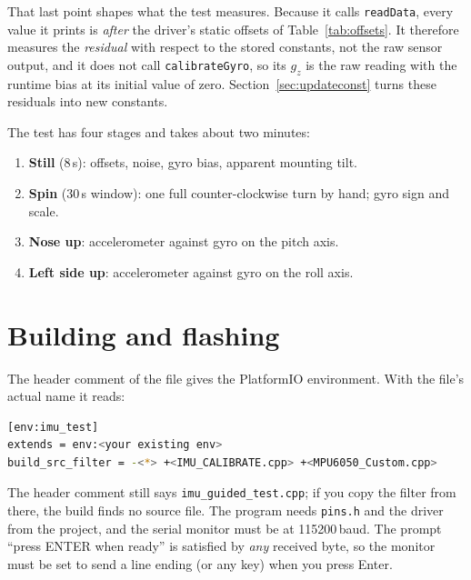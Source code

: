 \documentclass[11pt,a4paper]{report}
\newcommand{\code}[1]{\texttt{#1}}
\begin{document}
That last point shapes what the test measures. Because it calls \code{readData}, every value it prints is \emph{after} the driver's static offsets of Table~\ref{tab:offsets}. It therefore measures the \emph{residual} with respect to the stored constants, not the raw sensor output, and it does not call \code{calibrateGyro}, so its $g_z$ is the raw reading with the runtime bias at its initial value of zero. Section~\ref{sec:updateconst} turns these residuals into new constants.

The test has four stages and takes about two minutes:
\begin{enumerate}[noitemsep]
  \item \textbf{Still} (8\,s): offsets, noise, gyro bias, apparent mounting tilt.
  \item \textbf{Spin} (30\,s window): one full counter-clockwise turn by hand; gyro sign and scale.
  \item \textbf{Nose up}: accelerometer against gyro on the pitch axis.
  \item \textbf{Left side up}: accelerometer against gyro on the roll axis.
\end{enumerate}

\section{Building and flashing}
The header comment of the file gives the PlatformIO environment. With the file's actual name it reads:
\begin{lstlisting}[language=bash]
[env:imu_test]
extends = env:<your existing env>
build_src_filter = -<*> +<IMU_CALIBRATE.cpp> +<MPU6050_Custom.cpp>
\end{lstlisting}
The header comment still says \code{imu\_guided\_test.cpp}; if you copy the filter from there, the build finds no source file. The program needs \code{pins.h} and the driver from the project, and the serial monitor must be at 115200\,baud. The prompt ``press ENTER when ready'' is satisfied by \emph{any} received byte, so the monitor must be set to send a line ending (or any key) when you press Enter.
\end{document}
